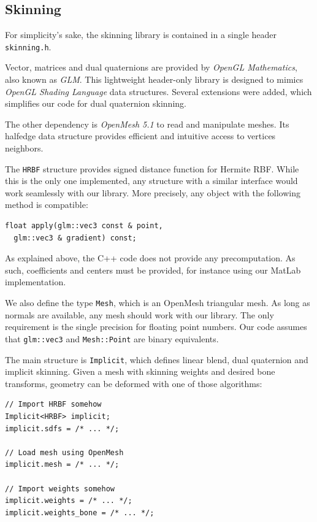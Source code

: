 \documentclass[a4paper,10pt]{article}
\begin{document}
\begin{multicols}{2}
\subsection{Skinning}

For simplicity's sake, the skinning library is contained in a single header \lstinline!skinning.h!.

Vector, matrices and dual quaternions are provided by \emph{OpenGL Mathematics}\cite{glm}, also known as \emph{GLM}.
This lightweight header-only library is designed to mimics \emph{OpenGL Shading Language} data structures.
Several extensions were added, which simplifies our code for dual quaternion skinning.

The other dependency is \emph{OpenMesh 5.1}\cite{openmesh} to read and manipulate meshes.
Its halfedge data structure provides efficient and intuitive access to vertices neighbors.

The \lstinline!HRBF! structure provides signed distance function for Hermite RBF.
While this is the only one implemented, any structure with a similar interface would work seamlessly with our library.
More precisely, any object with the following method is compatible:

\begin{lstlisting}
float apply(glm::vec3 const & point,
  glm::vec3 & gradient) const;
\end{lstlisting}

As explained above, the C++ code does not provide any precomputation.
As such, coefficients and centers must be provided, for instance using our MatLab implementation.

We also define the type \lstinline!Mesh!, which is an OpenMesh triangular mesh.
As long as normals are available, any mesh should work with our library.
The only requirement is the single precision for floating point numbers.
Our code assumes that \lstinline!glm::vec3! and \lstinline!Mesh::Point! are binary equivalents.

The main structure is \lstinline!Implicit!, which defines linear blend, dual quaternion and implicit skinning.
Given a mesh with skinning weights and desired bone transforms, geometry can be deformed with one of those algorithms:

\begin{lstlisting}
// Import HRBF somehow
Implicit<HRBF> implicit;
implicit.sdfs = /* ... */;

// Load mesh using OpenMesh
implicit.mesh = /* ... */;

// Import weights somehow
implicit.weights = /* ... */;
implicit.weights_bone = /* ... */;


\end{lstlisting}
\end{multicols}
\end{document}
